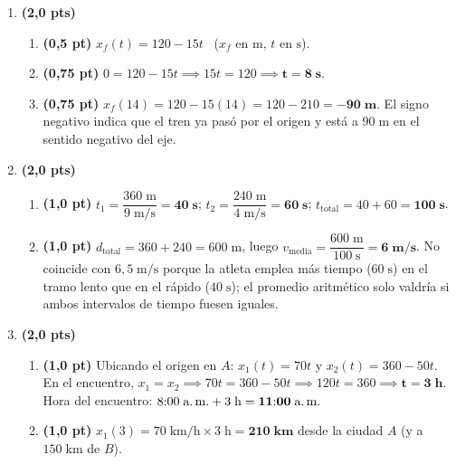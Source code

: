 \documentclass[12pt, letterpaper]{article}
\begin{document}
\begin{enumerate}[leftmargin=*, label=\textbf{\arabic*.}, start=6, itemsep=0.4em]
  \item \textbf{(2,0 pts)}
        \begin{enumerate}[label=\alph*), leftmargin=1.6em, nosep]
          \item \textbf{(0,5 pt)} $x_f(t) = 120 - 15t$ \ ($x_f$ en $\text{m}$, $t$ en $\text{s}$).
          \item \textbf{(0,75 pt)} $0 = 120 - 15t \implies 15t = 120 \implies \mathbf{t = 8\;\text{s}}$.
          \item \textbf{(0,75 pt)} $x_f(14) = 120 - 15(14) = 120 - 210 = \mathbf{-90\;\text{m}}$. El signo negativo indica que el tren ya pasó por el origen y está a $90\;\text{m}$ en el sentido negativo del eje.
        \end{enumerate}

  \item \textbf{(2,0 pts)}
        \begin{enumerate}[label=\alph*), leftmargin=1.6em, nosep]
          \item \textbf{(1,0 pt)} $t_1 = \dfrac{360\;\text{m}}{9\;\text{m/s}} = \mathbf{40\;\text{s}}$; \quad
                $t_2 = \dfrac{240\;\text{m}}{4\;\text{m/s}} = \mathbf{60\;\text{s}}$; \quad
                $t_{\text{total}} = 40 + 60 = \mathbf{100\;\text{s}}$.
          \item \textbf{(1,0 pt)} $d_{\text{total}} = 360 + 240 = 600\;\text{m}$, luego
                $v_{\text{media}} = \dfrac{600\;\text{m}}{100\;\text{s}} = \mathbf{6\;\text{m/s}}$.
                No coincide con $6{,}5\;\text{m/s}$ porque la atleta emplea más tiempo ($60\;\text{s}$) en el tramo lento que en el rápido ($40\;\text{s}$); el promedio aritmético solo valdría si ambos intervalos de tiempo fuesen iguales.
        \end{enumerate}

  \item \textbf{(2,0 pts)}
        \begin{enumerate}[label=\alph*), leftmargin=1.6em, nosep]
          \item \textbf{(1,0 pt)} Ubicando el origen en $A$: $x_1(t) = 70t$ y $x_2(t) = 360 - 50t$.
                En el encuentro, $x_1 = x_2 \implies 70t = 360 - 50t \implies 120t = 360 \implies \mathbf{t = 3\;\text{h}}$.
                Hora del encuentro: $8{:}00\;\text{a.\,m.} + 3\;\text{h} = \mathbf{11{:}00\;\text{a.\,m.}}$
          \item \textbf{(1,0 pt)} $x_1(3) = 70\;\text{km/h} \times 3\;\text{h} = \mathbf{210\;\text{km}}$ desde la ciudad $A$ (y a $150\;\text{km}$ de $B$).
        \end{enumerate}
\end{enumerate}
\end{document}
